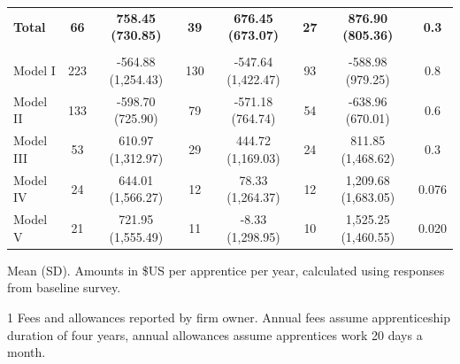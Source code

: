 \documentclass[
  11pt,
a4paper
]{report}
\begin{document}
\begin{table}[H]
{\begin{threeparttable}
\begin{tabular}[t]{lccccccc}
\textbf{\hspace{1em}Total} & \textbf{66} & \textbf{758.45 (730.85)} & \textbf{39} & \textbf{676.45 (673.07)} & \textbf{27} & \textbf{876.90 (805.36)} & \textbf{0.3}\\
\addlinespace[0.3em]
\multicolumn{8}{l}{\textbf{Net Benefits}}\\
\hspace{1em}Model I & 223 & -564.88 (1,254.43) & 130 & -547.64 (1,422.47) & 93 & -588.98 (979.25) & 0.8\\
\hspace{1em}Model II & 133 & -598.70 (725.90) & 79 & -571.18 (764.74) & 54 & -638.96 (670.01) & 0.6\\
\hspace{1em}Model III & 53 & 610.97 (1,312.97) & 29 & 444.72 (1,169.03) & 24 & 811.85 (1,468.62) & 0.3\\
\hspace{1em}Model IV & 24 & 644.01 (1,566.27) & 12 & 78.33 (1,264.37) & 12 & 1,209.68 (1,683.05) & 0.076\\
\hspace{1em}Model V & 21 & 721.95 (1,555.49) & 11 & -8.33 (1,298.95) & 10 & 1,525.25 (1,460.55) & 0.020\\
\bottomrule
\end{tabular}
\begin{tablenotes}
\small
\item Mean (SD). Amounts in \$US per apprentice per year, calculated using responses from baseline survey.
\item[1] Fees and allowances reported by firm owner. Annual fees assume apprenticeship duration of four years, annual allowances assume apprentices work 20 days a month.
\end{tablenotes}
\end{threeparttable}}
\end{table}
\end{document}

